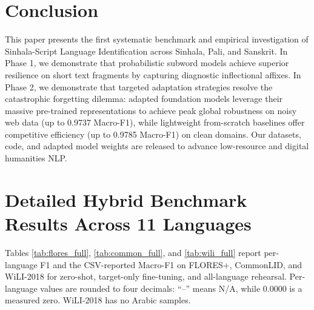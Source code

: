 \documentclass[11pt]{article}
\begin{document}
\section{Conclusion}
This paper presents the first systematic benchmark and empirical investigation of Sinhala-Script Language Identification across Sinhala, Pali, and Sanskrit. In Phase 1, we demonstrate that probabilistic subword models achieve superior resilience on short text fragments by capturing diagnostic inflectional affixes. In Phase 2, we demonstrate that targeted adaptation strategies resolve the catastrophic forgetting dilemma: adapted foundation models leverage their massive pre-trained representations to achieve peak global robustness on noisy web data (up to 0.9737 Macro-F1), while lightweight from-scratch baselines offer competitive efficiency (up to 0.9785 Macro-F1) on clean domains. Our datasets, code, and adapted model weights are released to advance low-resource and digital humanities NLP.



\appendix
\section{Detailed Hybrid Benchmark Results Across 11 Languages}
\label{sec:appendix_tables}

Tables \ref{tab:flores_full}, \ref{tab:common_full}, and \ref{tab:wili_full} report per-language F1 and the CSV-reported Macro-F1 on FLORES+, CommonLID, and WiLI-2018 for zero-shot, target-only fine-tuning, and all-language rehearsal. Per-language values are rounded to four decimals: ``--'' means N/A, while 0.0000 is a measured zero. WiLI-2018 has no Arabic samples.
\end{document}
